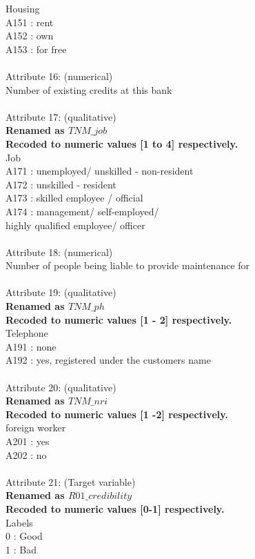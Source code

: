 \documentclass{article}\usepackage[]{graphicx}\usepackage[]{color}
\begin{document}
Housing\\
A151 : rent\\
A152 : own\\
A153 : for free\\
\\
Attribute 16: (numerical)\\
Number of existing credits at this bank\\
\\
Attribute 17: (qualitative)\\
\textbf{Renamed as \textit{$TNM\_ job$}}\\
\textbf{Recoded to numeric values [1 to 4] respectively.}\\
Job\\
A171 : unemployed/ unskilled - non-resident\\
A172 : unskilled - resident\\
A173 : skilled employee / official\\
A174 : management/ self-employed/\\
highly qualified employee/ officer\\
\\
Attribute 18: (numerical)\\
Number of people being liable to provide maintenance for\\
\\
Attribute 19: (qualitative)\\
\textbf{Renamed as \textit{$TNM\_ ph$}}\\
\textbf{Recoded to numeric values [1 - 2] respectively.}\\
Telephone\\
A191 : none\\
A192 : yes, registered under the customers name\\
\\
Attribute 20: (qualitative)\\
\textbf{Renamed as \textit{$TNM\_ nri$}}\\
\textbf{Recoded to numeric values [1 -2] respectively.}\\
foreign worker\\
A201 : yes\\
A202 : no \\
\\
Attribute 21: (Target variable)\\
\textbf{Renamed as \textit{$R01\_ credibility$}}\\
\textbf{Recoded to numeric values [0-1] respectively.}\\
Labels\\
0 : Good\\
1 : Bad \\
\end{document}
